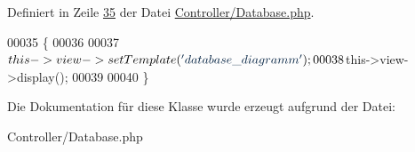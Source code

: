 Definiert in Zeile \hyperlink{_controller_2_database_8php_source_l00035}{35} der Datei \hyperlink{_controller_2_database_8php_source}{Controller/\-Database.\-php}.


\begin{DoxyCode}
00035                                           \{
00036                 
00037                 $this->view->setTemplate(\textcolor{stringliteral}{'database\_diagramm'});
00038                 $this->view->display();
00039                                 
00040         \}
\end{DoxyCode}


Die Dokumentation für diese Klasse wurde erzeugt aufgrund der Datei\-:\begin{DoxyCompactItemize}
\item 
Controller/\-Database.\-php\end{DoxyCompactItemize}
